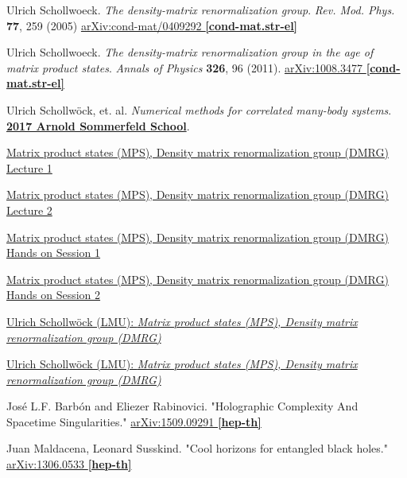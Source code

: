 \documentclass[10pt]{amsart}
\begin{document}
\begin{thebibliography}{9}
Ulrich Schollwoeck.  \emph{The density-matrix renormalization group}.   \emph{Rev. Mod. Phys.} \textbf{77}, 259 (2005)	\href{https://arxiv.org/abs/cond-mat/0409292}{arXiv:cond-mat/0409292 \textbf{[cond-mat.str-el]}}

Ulrich Schollwoeck.  \emph{The density-matrix renormalization group in the age of matrix product states}.  \emph{Annals of Physics} \textbf{326}, 96 (2011).  \href{https://arxiv.org/abs/1008.3477}{arXiv:1008.3477 \textbf{[cond-mat.str-el]}}

Ulrich Schollw\"{o}ck, et. al. \emph{Numerical methods for correlated many-body systems}. \href{https://www.asc.physik.lmu.de/activities/schools/archiv/asc_school_17/index.html}{\textbf{2017 Arnold Sommerfeld School}}. 

\href{https://cast.itunes.uni-muenchen.de/clips/WE0Gf4L6f3/vod/high_quality.mp4}{Matrix product states (MPS), Density matrix renormalization group (DMRG) Lecture 1} 

\href{https://cast.itunes.uni-muenchen.de/clips/1PTFIT1n42/vod/high_quality.mp4}{Matrix product states (MPS), Density matrix renormalization group (DMRG) Lecture 2} 

\href{https://cast.itunes.uni-muenchen.de/clips/uN8yxWC8m9/vod/high_quality.mp4}{Matrix product states (MPS), Density matrix renormalization group (DMRG) Hands on Session 1} 

\href{https://cast.itunes.uni-muenchen.de/clips/xJRe4DD7Fo/vod/high_quality.mp4}{Matrix product states (MPS), Density matrix renormalization group (DMRG) Hands on Session 2} 

\href{https://www.asc.physik.lmu.de/activities/schools/archiv/asc_school_17/extramaterial/schollwoeck_asc_1.pdf}{Ulrich Schollw\"{o}ck (LMU): \emph{Matrix product states (MPS), Density matrix renormalization group (DMRG)}}

\href{https://www.asc.physik.lmu.de/activities/schools/archiv/asc_school_17/extramaterial/schollwoeck_asc_2.pdf}{Ulrich Schollw\"{o}ck (LMU): \emph{Matrix product states (MPS), Density matrix renormalization group (DMRG)}}


Jos\'{e} L.F. Barb\'{o}n and Eliezer Rabinovici.  "Holographic Complexity And Spacetime Singularities."  \href{https://arxiv.org/abs/1509.09291v3}{arXiv:1509.09291 \textbf{[hep-th]}}

Juan Maldacena, Leonard Susskind.  "Cool horizons for entangled black holes."  \href{https://arxiv.org/abs/1306.0533}{ 	arXiv:1306.0533 \textbf{[hep-th]}}


\end{thebibliography}
\end{document}
